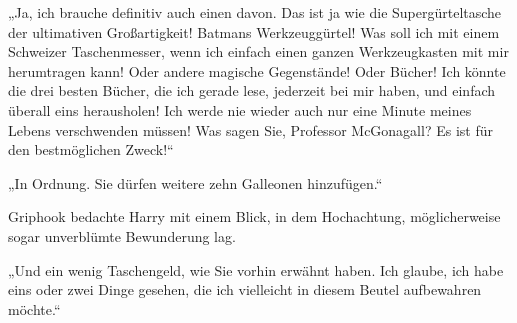 „Ja, ich brauche definitiv auch einen davon. Das ist ja wie die Supergürteltasche der ultimativen Großartigkeit! Batmans Werkzeuggürtel! Was soll ich mit einem Schweizer Taschenmesser, wenn ich einfach einen ganzen Werkzeugkasten mit mir herumtragen kann! Oder andere magische Gegenstände! Oder Bücher! Ich könnte die drei besten Bücher, die ich gerade lese, jederzeit bei mir haben, und einfach überall eins herausholen! Ich werde nie wieder auch nur eine Minute meines Lebens verschwenden müssen! Was sagen Sie, Professor McGonagall? Es ist für den bestmöglichen Zweck!“

„In Ordnung. Sie dürfen weitere zehn Galleonen hinzufügen.“

Griphook bedachte Harry mit einem Blick, in dem Hochachtung, möglicherweise sogar unverblümte Bewunderung lag.

„Und ein wenig Taschengeld, wie Sie vorhin erwähnt haben. Ich glaube, ich habe eins oder zwei Dinge gesehen, die ich vielleicht in diesem Beutel aufbewahren möchte.“

